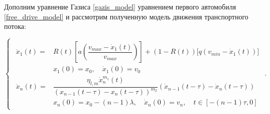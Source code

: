 \documentclass[12pt, a4paper]{extarticle}
\numberwithin{equation}{section}
\begin{document}
Дополним уравнение Газиса \eqref{gazis_model} уравнением первого автомобиля \eqref{free_drive_model} и рассмотрим полученную модель движения транспортного потока:

\begin{equation} \label{full_gazis_model}
\begin{cases}
\begin{split}
\ddot{x}_1(t) = &R(t) \left[ a\left(\dfrac{v_{max}-\dot{x}_1(t)}{v_{max}} \right)\right] + (1-R(t)) \bigg[ q\left( v_{min} - \dot{x}_1(t)\right) \bigg]  \\
&x_{1}(0)=x_0, \quad \dot{x}_{1}(0)=v_{0}\\
\ddot{x}_n(t) = & \dfrac{\eta_{l,m}\dot{x}_n^{m_1}(t)}{(x_{n-1}(t-\tau)-x_n(t-\tau))^{m_2}} (\dot{x}_{n-1}(t-\tau) - \dot{x}_{n}(t-\tau)) \\
&x_n(0)=x_0-(n-1)\lambda, \quad \dot{x}_n(0)=v_{n}, \quad t \in [-(n-1)\tau,0]
\end{split}
\end{cases}.
\end{equation}
\end{document}
